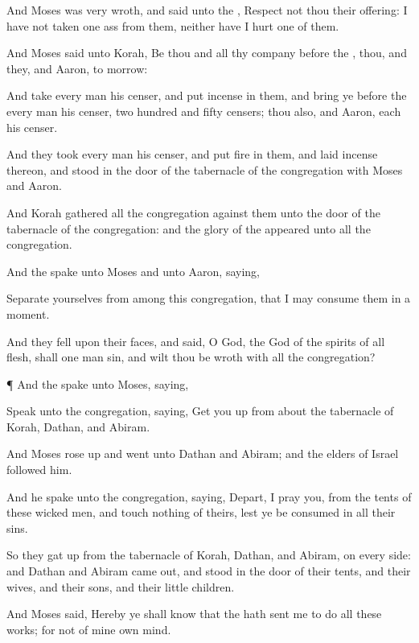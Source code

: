 {And
Moses was
very
wroth, and
said unto the
{},
Respect not thou their
offering: I have not
taken
one
ass from them, neither have I
hurt
one of them.

And
Moses
said unto
Korah, Be thou and all thy
company
before the
{}, thou, and they, and
Aaron, to
morrow:

And
take every
man his
censer, and
put
incense in them, and
bring ye
before the
{} every
man his
censer, two
hundred and
fifty
censers; thou also, and
Aaron,
each
{} his
censer.

And they
took every
man his
censer, and
put
fire in them, and
laid
incense thereon, and
stood in the
door of the
tabernacle of the
congregation with
Moses and
Aaron.

And
Korah
gathered all the
congregation against them unto the
door of the
tabernacle of the
congregation: and the
glory of the
{}
appeared unto all the
congregation.

And the
{}
spake unto
Moses and unto
Aaron,
saying,

Separate yourselves from
among this
congregation, that I may
consume them in a
moment.

And they
fell upon their
faces, and
said, O
God, the
God of the
spirits of all
flesh, shall
one
man
sin, and wilt thou be
wroth with all the
congregation?


\par }{\PP {}¶ And the
{}
spake unto
Moses,
saying,

Speak unto the
congregation,
saying, Get you
up from
about the
tabernacle of
Korah,
Dathan, and
Abiram.

And
Moses rose
up and
went unto
Dathan and
Abiram; and the
elders of
Israel
followed
him.

And he
spake unto the
congregation,
saying,
Depart, I pray you, from the
tents of these
wicked
men, and
touch nothing of theirs, lest ye be
consumed in all their
sins.

So they gat
up from the
tabernacle of
Korah,
Dathan, and
Abiram, on every
side: and
Dathan and
Abiram came
out, and
stood in the
door of their
tents, and their
wives, and their
sons, and their little
children.

And
Moses
said, Hereby ye shall
know that the
{} hath
sent me to
do all these
works; for
{} not
{} of mine own
mind.

}
